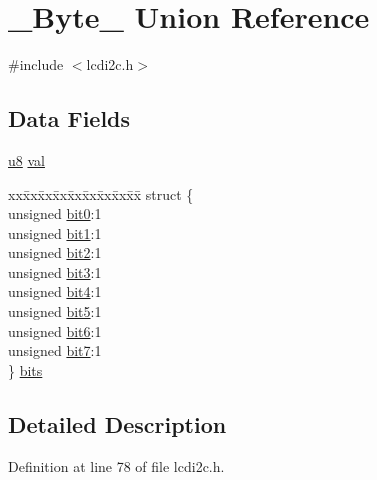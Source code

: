 \hypertarget{union___byte__}{\section{\-\_\-\-Byte\-\_\- Union Reference}
\label{union___byte__}
}


{\ttfamily \#include $<$lcdi2c.\-h$>$}

\subsection*{Data Fields}
\begin{DoxyCompactItemize}
\item 
\hyperlink{p8_2pinguino_2core_2typedef_8h_aed742c436da53c1080638ce6ef7d13de}{u8} \hyperlink{union___byte___a5d0cde7a426451812b691b5ae4a01560}{val}
\item 
\begin{tabbing}
xx\=xx\=xx\=xx\=xx\=xx\=xx\=xx\=xx\=\kill
struct \{\\
\>unsigned \hyperlink{union___byte___a0431bdd0457eee8f478543c2ebeed536}{bit0}:1\\
\>unsigned \hyperlink{union___byte___a3c8a699d0b9fee5bcccf99a37fb5f7b4}{bit1}:1\\
\>unsigned \hyperlink{union___byte___a047292ded0521ee6eccf3b553d53f46e}{bit2}:1\\
\>unsigned \hyperlink{union___byte___ad8e1e9f4aeee9f8766d9c0b5297093bb}{bit3}:1\\
\>unsigned \hyperlink{union___byte___a8236c7b2559b977adbaf5255d2111814}{bit4}:1\\
\>unsigned \hyperlink{union___byte___aac6dabd343d82afedb3e175c7960b2d0}{bit5}:1\\
\>unsigned \hyperlink{union___byte___a6ea1dee0891a483350d275761ad97c1a}{bit6}:1\\
\>unsigned \hyperlink{union___byte___a1c1d68aa52ca32b5df0afaf1e83e59ed}{bit7}:1\\
\} \hyperlink{union___byte___a837b65c8cf71bb4347b760ea732b8f11}{bits}\\

\end{tabbing}\end{DoxyCompactItemize}


\subsection{Detailed Description}


Definition at line 78 of file lcdi2c.\-h.



